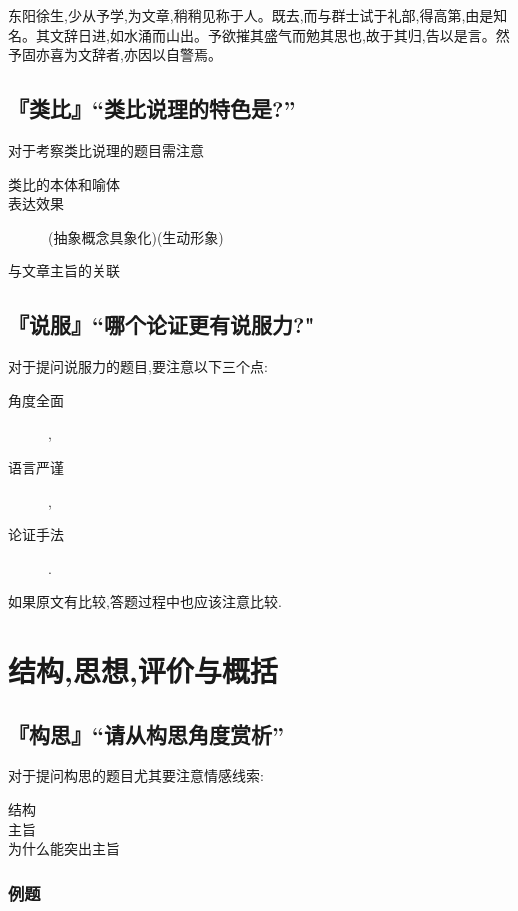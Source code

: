 \documentclass{ctexart}
\begin{document}
东阳徐生,少从予学,为文章,稍稍见称于人。既去,而与群士试于礼部,得高第,由是知名。其文辞日进,如水涌而山出。予欲摧其盛气而勉其思也,故于其归,告以是言。然予固亦喜为文辞者,亦因以自警焉。

\subsection{『类比』``类比说理的特色是?''}

对于考察类比说理的题目需注意

\begin{description}
	\item[类比的本体和喻体]
	\item[表达效果] (抽象概念具象化)(生动形象)
	\item[与文章主旨的关联]
\end{description}


\subsection{『说服』``哪个论证更有说服力?"}
\large 对于提问说服力的题目,要注意以下三个点:

\begin{description}
	\item[角度全面],
	\item[语言严谨],
	\item[论证手法].
\end{description}

如果原文有比较,答题过程中也应该注意比较.


\newpage

\section{结构,思想,评价与概括}

\subsection{『构思』``请从构思角度赏析''}

对于提问构思的题目尤其要注意情感线索:
\begin{description}
	\item[结构]
	\item[主旨]
	\item[为什么能突出主旨]
\end{description}

\subsubsection{例题}
\end{document}
